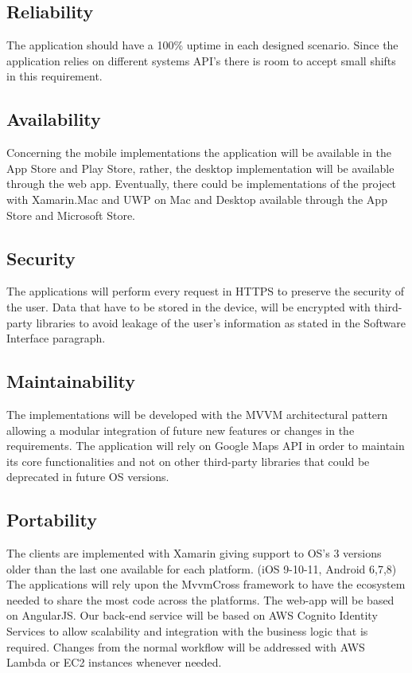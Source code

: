 \subsection{Reliability}
The application should have a 100\% uptime in each designed scenario. Since the application relies on different systems API’s there is room to accept small shifts in this requirement.

\subsection{Availability}
Concerning the mobile implementations the application will be available in the App Store and Play Store, rather, the desktop implementation will be available through the web app.
Eventually, there could be implementations of the project with Xamarin.Mac and UWP on Mac and Desktop available through the App Store and Microsoft Store.

\subsection{Security}
The applications will perform every request in HTTPS to preserve the security of the user. 
Data that have to be stored in the device, will be encrypted with third-party libraries to avoid leakage of the user’s information as stated in the Software Interface paragraph.

\subsection{Maintainability}
The implementations will be developed with the MVVM architectural pattern allowing a modular integration of future new features or changes in the requirements. 
The application will rely on Google Maps API in order to maintain its core functionalities and not on other third-party libraries that could be deprecated in future OS versions.

\subsection{Portability}
The clients are implemented with Xamarin giving support to OS’s 3 versions older than the last one available for each platform. (iOS 9-10-11, Android 6,7,8)
The applications will rely upon the MvvmCross framework to have the ecosystem needed to share the most code across the platforms.
The web-app will be based on AngularJS.
Our back-end service will be based on AWS Cognito Identity Services to allow scalability and integration with the business logic that is required. 
Changes from the normal workflow will be addressed with AWS Lambda or EC2 instances whenever needed.